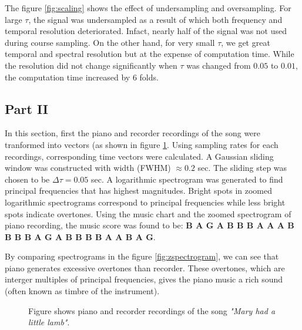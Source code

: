 \documentclass{article}
\begin{document}
The figure \ref{fig:scaling} shows the effect of undersampling and oversampling. For large $\tau$, the signal was undersampled as a result of which both frequency and temporal resolution deteriorated. Infact, nearly half of the signal was not used during course sampling. On the other hand, for very small $\tau$, we get great temporal and spectral resolution but at the expense of computation time. While the resolution did not change significantly when $\tau$ was changed from $0.05$ to $0.01$, the computation time increased by $6$ folds.

\subsection{Part II}
In this section, first the piano and recorder recordings of the song were tranformed into vectors (as shown in figure \ref{fig:recording}. Using sampling rates for each recordings, corresponding time vectors were calculated. A Gaussian sliding window was constructed with width (FWHM) $\approx 0.2$ sec. The sliding step was chosen to be $\Delta \tau = 0.05$ sec. A logarithmic spectrogram was generated to find principal frequencies that has highest magnitudes. Bright spots in zoomed logarithmic spectrograms correspond to principal frequencies while less bright spots indicate overtones. Using the music chart and the zoomed spectrogram of piano recording, the music score was found to be: \textbf{B A G A B B B A A A B B B B A G A B B B B A A B A G}.

By comparing spectrograms in the figure \ref{fig:zspectrogram}, we can see that piano generates excessive overtones than recorder. These overtones, which are interger multiples of principal frequencies, gives the piano music a rich sound (often known as timbre of the instrument).

\begin{figure}[!h]
\caption{Figure shows piano and recorder recordings of the song \textit{"Mary had a little lamb"}.}
\label{fig:recording}
\end{figure}
\end{document}
